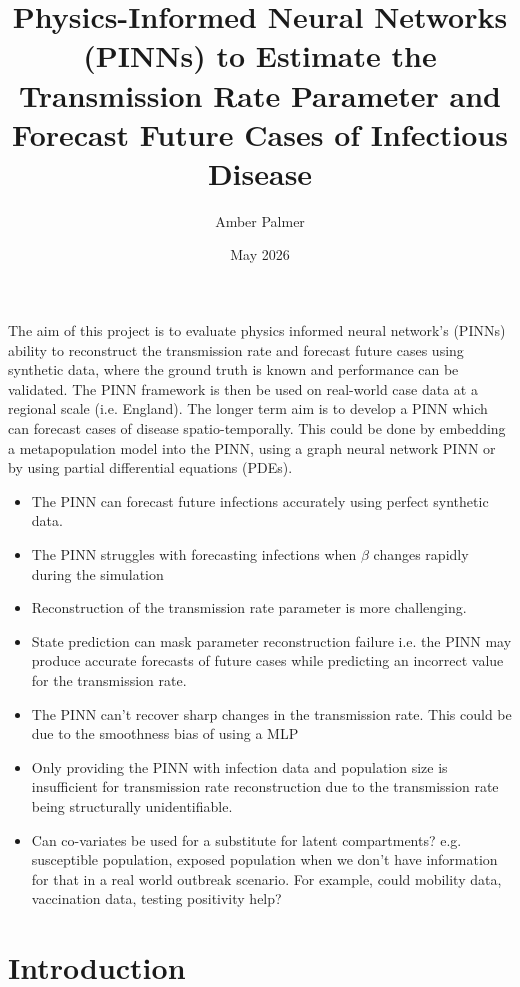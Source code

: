\documentclass{article}
\title{Physics-Informed Neural Networks (PINNs) to Estimate the Transmission Rate Parameter and Forecast Future Cases of Infectious Disease}
\author{Amber Palmer}
\date{May 2026}
\begin{document}
\maketitle

The aim of this project is to evaluate physics informed neural network's (PINNs) ability to reconstruct the transmission rate and forecast future cases using synthetic data, where the ground truth is known and performance can be validated. The PINN framework is then be used on real-world case data at a regional scale (i.e. England). The longer term aim is to develop a PINN which can forecast cases of disease spatio-temporally. This could be done by embedding a metapopulation model into the PINN, using a graph neural network PINN or by using partial differential equations (PDEs). 

\begin{itemize}
    \item The PINN can forecast future infections accurately using perfect synthetic data.
    \item The PINN struggles with forecasting infections when $\beta$ changes rapidly during the simulation
    \item Reconstruction of the transmission rate parameter is more challenging.
    \item State prediction can mask parameter reconstruction failure i.e. the PINN may produce accurate forecasts of future cases while predicting an incorrect value for the transmission rate.
    \item The PINN can't recover sharp changes in the transmission rate. This could be due to the smoothness bias of using a MLP \parencite{https://doi.org/10.48550/arxiv.2602.19265, https://doi.org/10.48550/arxiv.1806.08734}
    \item Only providing the PINN with infection data and population size is insufficient for transmission rate reconstruction due to the transmission rate being structurally unidentifiable. 
    \item Can co-variates be used for a substitute for latent compartments? e.g. susceptible population, exposed population when we don't have information for that in a real world outbreak scenario. For example, could mobility data, vaccination data, testing positivity help? \parencite{Pant2026}
    
    
\end{itemize}

\tableofcontents

\section{Introduction}
\end{document}
